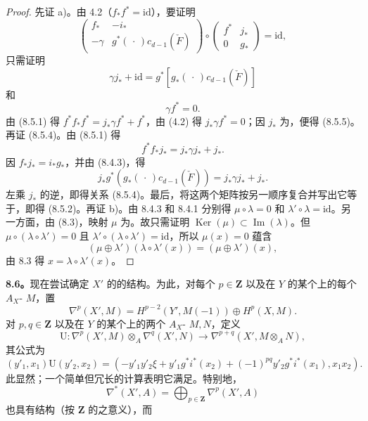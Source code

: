 \begin{proof}
先证 a)。由 4.2（$f_*f^*=\mathrm{id}$），要证明
\[
\begin{pmatrix}f_*&-i_*\\-\gamma&g^*(\,\cdot\,)c_{d-1}(\check F)\end{pmatrix}
\circ\begin{pmatrix}f^*&j_*\\0&g_*\end{pmatrix}=\mathrm{id},
\]
只需证明
\[
 \gamma j_*+\mathrm{id}=g^*[g_*(\,\cdot\,)c_{d-1}(\check F)]\tag{8.5.4}
\]
和
\[
 \gamma f^*=0.\tag{8.5.5}
\]
由 (8.5.1) 得 $f^*f_*f^*=j_*\gamma f^*+f^*$，由 (4.2) 得 $j_*\gamma f^*=0$；因 $j_*$ 为，便得 (8.5.5)。再证 (8.5.4)。由 (8.5.1) 得
\[
 f^*f_*j_*=j_*\gamma j_*+j_*.
\]
因 $f_*j_*=i_*g_*$，并由 (8.4.3)，得
\[
 j_*g^*(g_*(\,\cdot\,)c_{d-1}(\check F))=j_*\gamma j_*+j_*.
\]
左乘 $j_*$ 的逆，即得关系 (8.5.4)。最后，将这两个矩阵按另一顺序复合并写出它等于，即得 (8.5.2)。再证 b)。由 8.4.3 和 8.4.1 分别得 $\mu\circ\lambda=0$ 和 $\lambda'\circ\lambda=\mathrm{id}$。另一方面，由 (8.3)，映射 $\mu$ 为。故只需证明 $\operatorname{Ker}(\mu)\subset\operatorname{Im}(\lambda)$。但 $\mu\circ(\lambda\circ\lambda')=0$ 且 $\lambda'\circ(\lambda\circ\lambda')=\mathrm{id}$，所以 $\mu(x)=0$ 蕴含
\[
 (\mu\oplus\lambda')(\lambda\circ\lambda'(x))=(\mu\oplus\lambda')(x),
\]
由 8.3 得 $x=\lambda\circ\lambda'(x)$。
\end{proof}
\textbf{8.6。}现在尝试确定 $X'$ 的的结构。为此，对每个 $p\in\mathbf Z$ 以及在 $Y$ 的某个上的每个 $A_X$- $M$，置
\[
 \nabla^p(X',M)=H^{p-2}(Y',M(-1))\oplus H^p(X,M).
\]
对 $p,q\in\mathbf Z$ 以及在 $Y$ 的某个上的两个 $A_X$- $M,N$，定义
\[
 \mathrm U:\nabla^p(X',M)\otimes_A\nabla^q(X',N)
 \longrightarrow\nabla^{p+q}(X',M\otimes_A N),
 \tag{8.6.1}
\]
其公式为
\[
 (y'_1,x_1)\mathbin{\mathrm U}(y'_2,x_2)=
 (-y'_1y'_2\xi+y'_1g^*i^*(x_2)+(-1)^{pq}y'_2g^*i^*(x_1),x_1x_2).
 \tag{8.6.2}
\]
此显然；一个简单但冗长的计算表明它满足。特别地，
\[
 \nabla^*(X',A)=\bigoplus_{p\in\mathbf Z}\nabla^p(X',A)
\]
也具有结构（按 $\mathbf Z$ 的之意义），而
